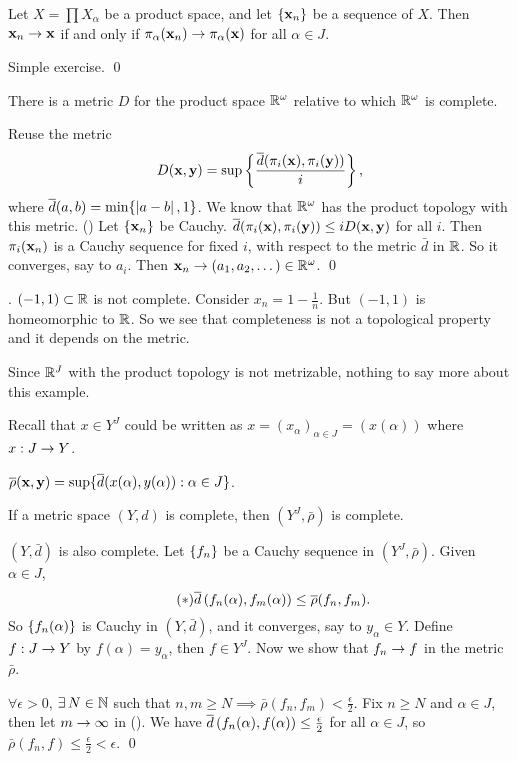 \rmk {} Let \(X = \prod X_\alpha\) be a product space, and let \(\seq{\bf{x}_n}\) be a sequence of \(X\). Then \(\bf{x}_n \ra \bf{x}\) if and only if \(\pi_\alpha(\bf{x}_n) \ra \pi_\alpha(\bf{x})\) for all \(\alpha \in J\).

\pf Simple exercise. \qed

 There is a metric \(D\) for the product space \(\R^\omega\) relative to which \(\R^\omega\) is complete.

\pf Reuse the metric
\[
    D(\bf{x}, \bf{y}) = \sup \left\{ \frac{\bar{d}(\pi_i (\bf{x}), \pi_i(\bf{y}))}{i}\right\},
\]
where \(\bar{d}(a, b) = \min\{\abs{a - b}, 1\}\). We know that \(\R^\omega\) has the product topology with this metric. () Let \(\seq{\bf{x}_n}\) be Cauchy. \(\bar{d}(\pi_i(\bf{x}), \pi_i(\bf{y})) \leq i D(\bf{x}, \bf{y})\) for all \(i\). Then \(\pi_i(\bf{x}_n)\) is a Cauchy sequence for fixed \(i\), with respect to the metric \(\bar{d}\) in \(\R\). So it converges, say to \(a_i\). Then \(\bf{x}_n \ra (a_1, a_2, \dots) \in \R^\omega\). \qed

\ex. \((-1, 1) \subset \R\) is not complete. Consider \(x_n = 1 - \frac{1}{n}\). But \((-1, 1)\) is homeomorphic to \(\R\). So we see that completeness is not a topological property and it depends on the metric.

Since \(\R^J\) with the product topology is not metrizable, nothing to say more about this example.

\notation Recall that \(x \in Y^J\) could be written as \(x = (x_\alpha)_{\alpha \in J} = (x(\alpha))\) where \(x : J \ra Y\).

\recall \(\bar{\rho}(\bf{x}, \bf{y}) = \sup\{\bar{d}(x(\alpha), y(\alpha)) : \alpha \in J\}\).

 If a metric space \((Y, d)\) is complete, then \((Y^J, \bar{\rho})\) is complete.

\pf \((Y, \bar{d})\) is also complete. Let \(\seq{f_n}\) be a Cauchy sequence in \((Y^J, \bar{\rho})\). Given \(\alpha \in J\),
\[ \tag{\mast}
    \bar{d}\paren{f_n(\alpha), f_m(\alpha)} \leq \bar{\rho}(f_n, f_m).
\]
So \(\seq{f_n(\alpha)}\) is Cauchy in \((Y, \bar{d})\), and it converges, say to \(y_\alpha \in Y\). Define \(f : J \ra Y\) by \(f(\alpha) = y_\alpha\), then \(f \in Y^J\). Now we show that \(f_n \ra f\) in the metric \(\bar{\rho}\).

\(\forall \epsilon > 0\), \(\exists N \in \N\) such that \(n,m \geq N \implies \bar{\rho}(f_n, f_m) < \frac{\epsilon}{2}\). Fix \(n \geq N\) and \(\alpha \in J\), then let \(m \ra \infty\) in (\mast). We have \(\bar{d}\paren{f_n(\alpha), f(\alpha)} \leq \frac{\epsilon}{2}\) for all \(\alpha \in J\), so \(\bar{\rho}(f_n, f) \leq \frac{\epsilon}{2} < \epsilon\). \qed

\pagebreak
